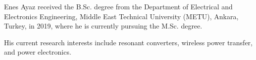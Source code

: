 \documentclass[journal]{IEEEtran}
\begin{document}


\vspace{-4mm}
\begin{IEEEbiography}
{Enes Ayaz} received the B.Sc. degree from the Department of Electrical and Electronics Engineering, Middle East Technical University (METU), Ankara, Turkey, in 2019, where he is currently pursuing the M.Sc. degree.

His current research interests include resonant converters, wireless power transfer, and power electronics.
\end{IEEEbiography}
\end{document}
